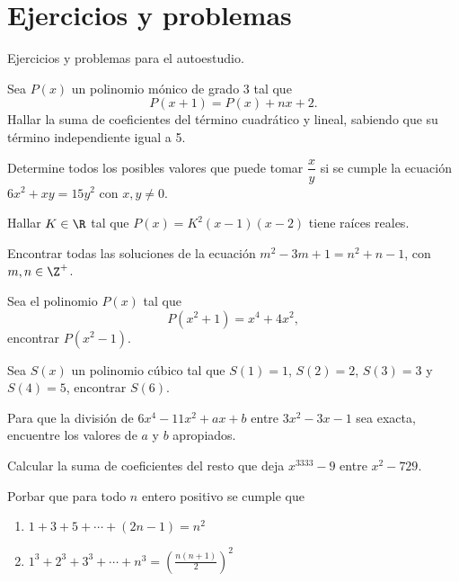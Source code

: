 \section{Ejercicios y problemas}

Ejercicios y problemas para el autoestudio.

\begin{exercise}
    Sea $P(x)$ un polinomio mónico de grado 3 tal que
    \[
        P(x + 1) = P(x) + nx + 2.
    \]
    Hallar la suma de coeficientes del término cuadrático y lineal, sabiendo que su término independiente igual a 5.
\end{exercise}

\begin{exercise}
    Determine todos los posibles valores que puede tomar $\dfrac{x}{y}$ si se cumple la ecuación $6x^2 + xy = 15y^2$ con $x,y \neq 0$.
\end{exercise}

\begin{exercise}
    Hallar $K \in \R$ tal que $P(x) = K^2(x - 1)(x - 2)$ tiene raíces reales.
\end{exercise}

\begin{exercise}
    Encontrar todas las soluciones de la ecuación $m^2 - 3m + 1 = n^2 + n - 1$, con $m, n \in \Z^{+}$.
\end{exercise}

\begin{exercise}
    Sea el polinomio $P(x)$ tal que
    \[
        P(x^2 + 1) = x^4 + 4x^2,
    \]
    encontrar $P(x^2 - 1).$
\end{exercise}

\begin{exercise}
    Sea $S(x)$ un polinomio cúbico tal que $S(1) = 1$, $S(2) = 2$, $S(3) = 3$ y $S(4) = 5$, encontrar $S(6)$.
\end{exercise}

\begin{exercise}
    Para que la división de $6x^4 - 11x^2 + ax + b$ entre $3x^2 - 3x - 1$ sea exacta, encuentre los valores de $a$ y $b$ apropiados.
\end{exercise}

\begin{exercise}
    Calcular la suma de coeficientes del resto que deja $x^{3333} - 9$ entre $x^2 - 729$.
\end{exercise}

\begin{exercise}
    Porbar que para todo $n$ entero positivo se cumple que
    \begin{enumerate}
        \item $1 + 3 + 5 + \cdots + \left(2n - 1\right) = n^2$
        \item $1^3 + 2^3 + 3^3  + \cdots + n^3 = \left(\frac{n (n + 1)}{2}\right)^2$
    \end{enumerate}
\end{exercise}

